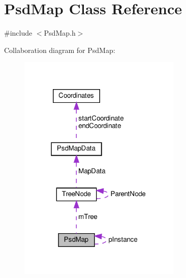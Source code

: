 \hypertarget{class_psd_map}{}\section{Psd\+Map Class Reference}
\label{class_psd_map}


{\ttfamily \#include $<$Psd\+Map.\+h$>$}



Collaboration diagram for Psd\+Map\+:\nopagebreak
\begin{figure}[H]
\begin{center}
\leavevmode
\includegraphics[width=220pt]{class_psd_map__coll__graph}
\end{center}
\end{figure}
